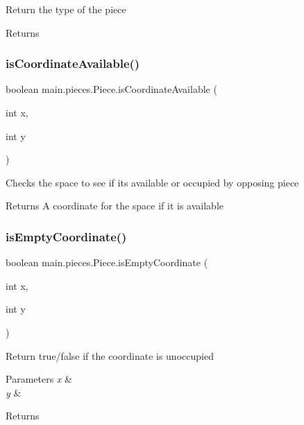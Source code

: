 Return the type of the piece \begin{DoxyReturn}{Returns}

\end{DoxyReturn}
\hypertarget{classmain_1_1pieces_1_1_piece_a164f24eb41f07fe4cb93d960f24d8638}{}\label{classmain_1_1pieces_1_1_piece_a164f24eb41f07fe4cb93d960f24d8638} 
\subsubsection{\texorpdfstring{is\+Coordinate\+Available()}{isCoordinateAvailable()}}
{\footnotesize\ttfamily boolean main.\+pieces.\+Piece.\+is\+Coordinate\+Available (\begin{DoxyParamCaption}\item[{int}]{x,  }\item[{int}]{y }\end{DoxyParamCaption})\hspace{0.3cm}{\ttfamily [protected]}}

Checks the space to see if its available or occupied by opposing piece \begin{DoxyReturn}{Returns}
A coordinate for the space if it is available 
\end{DoxyReturn}
\hypertarget{classmain_1_1pieces_1_1_piece_a74326d9253471ad25f8edb83bec207f6}{}\label{classmain_1_1pieces_1_1_piece_a74326d9253471ad25f8edb83bec207f6} 
\subsubsection{\texorpdfstring{is\+Empty\+Coordinate()}{isEmptyCoordinate()}}
{\footnotesize\ttfamily boolean main.\+pieces.\+Piece.\+is\+Empty\+Coordinate (\begin{DoxyParamCaption}\item[{int}]{x,  }\item[{int}]{y }\end{DoxyParamCaption})\hspace{0.3cm}{\ttfamily [protected]}}

Return true/false if the coordinate is unoccupied 
\begin{DoxyParams}{Parameters}
{\em x} & \\
\hline
{\em y} & \\
\hline
\end{DoxyParams}
\begin{DoxyReturn}{Returns}

\end{DoxyReturn}
\hypertarget{classmain_1_1pieces_1_1_piece_a92a37b2f68604a6f2c8ece28d9a96080}{}\label{classmain_1_1pieces_1_1_piece_a92a37b2f68604a6f2c8ece28d9a96080} 
